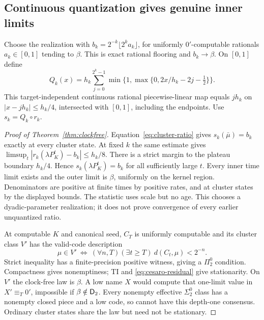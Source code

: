 \subsection{Continuous quantization gives genuine inner limits}
Choose the realization with
$b_k=2^{-k}\lfloor2^ka_k\rfloor$, for uniformly $0'$-computable
rationals $a_k\in[0,1]$ tending to $\beta$. This is exact rational
flooring and $b_k\to\beta$. On $[0,1]$ define
\begin{equation}\label{eq:quantizer}
 Q_k(x)=h_k\sum_{j=0}^{2^k-1}
   \min\{1,\max\{0,2x/h_k-2j-\tfrac12\}\}.
\end{equation}
This target-independent continuous rational piecewise-linear map
equals $jh_k$ on $|x-jh_k|\leq h_k/4$, intersected with $[0,1]$,
including the endpoints. Use $s_k=Q_k\circ r_k$.

\begin{proof}[Proof of Theorem~\ref{thm:clockfree}]
Equation~\eqref{eq:cluster-ratio} gives $s_k(\bar\mu)=b_k$
exactly at every cluster state. At fixed $k$ the same estimate gives
$\limsup_t|r_k(\lambda P_K^t)-b_k|\leq h_k/8$.
There is a strict margin to the plateau boundary $h_k/4$.
Hence $s_k(\lambda P_K^t)=b_k$ for all sufficiently large $t$.
Every inner time limit exists and the outer limit is $\beta$,
uniformly on the kernel region. Denominators are positive at
finite times by positive rates, and at cluster states by the
displayed bounds. The statistic uses scale but no age. This
chooses a dyadic-parameter realization; it does not prove convergence
of every earlier unquantized ratio.

At computable $K$ and canonical seed, $C_T$ is uniformly computable
and its cluster class $V'$ has the valid-code description
\begin{equation}\label{eq:cluster-pi2}
 \mu\in V'\ \Longleftrightarrow\
 (\forall n,T)(\exists t\geq T)\ d(C_t,\mu)<2^{-n}.
\end{equation}
Strict inequality has a finite-precision positive witness, giving
a $\Pi^0_2$ condition. Compactness gives nonemptiness; TI and
\eqref{eq:cesaro-residual} give stationarity. On $V'$ the
clock-free law is $\beta$. A low name $X$ would compute that
one-limit value in $X'\equiv_T0'$, impossible if $\beta\notin\mathsf D_2$.
Every nonempty effective $\Sigma^0_2$ class has a nonempty closed
piece and a low code, so cannot have this depth-one consensus.
Ordinary cluster states share the law but need not be stationary.
\end{proof}

